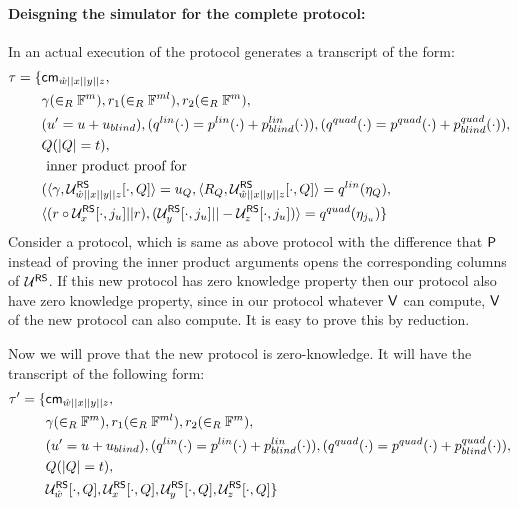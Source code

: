 \paragraph{Deisgning the simulator for the complete protocol: } In an actual execution of the protocol generates a transcript of the form:
\begin{align*}
\tau = \{ 
& \mathsf{cm}_{\hat{w}||x||y||z},\\
& \gamma(\in_R \mathbb{F}^{m}), r_1(\in_R \mathbb{F}^{ml}), r_2(\in_R \mathbb{F}^m), \\ 
& (u' = u+u_{blind}), (q^{lin}(\cdot) = p^{lin}(\cdot)+p^{lin}_{blind}(\cdot)), (q^{quad}(\cdot) = p^{quad}(\cdot) + p^{quad}_{blind}(\cdot)),\\
& Q (|Q|=t),\\
& \text{ inner product proof for } \\
& (\langle \gamma,\mathcal{U}^{\mathsf{RS}}_{\hat{w}||x||y||z}[\cdot, Q]\rangle = u_Q, \langle R_Q,\mathcal{U}^{\mathsf{RS}}_{\hat{w}||x||y||z}[\cdot, Q]\rangle=q^{lin}(\eta_Q),\\
& \langle (r\circ \mathcal{U}^{\mathsf{RS}}_x[\cdot,j_u]||r),(\mathcal{U}^{\mathsf{RS}}_y[\cdot,j_u]||-\mathcal{U}^{\mathsf{RS}}_z[\cdot,j_u])\rangle = q^{quad}(\eta_{j_u})
\}
\end{align*}
Consider a protocol, which is same as above protocol with the difference that $\mathsf{P}$ instead of proving the inner product arguments opens the corresponding columns of $\mathcal{U}^{\mathsf{RS}}$. If this new protocol has zero knowledge property then our protocol also have zero knowledge property, since in our protocol whatever $\mathsf{V}$ can compute, $\mathsf{V}$ of the new protocol can also compute. It is easy to prove this by reduction.

Now we will prove that the new protocol is zero-knowledge. It will have the transcript of the following form:
\begin{align*}
\tau' = \{
& \mathsf{cm}_{\hat{w}||x||y||z},\\
& \gamma(\in_R \mathbb{F}^{m}), r_1(\in_R \mathbb{F}^{ml}), r_2(\in_R \mathbb{F}^m), \\ 
& (u' = u+u_{blind}), (q^{lin}(\cdot) = p^{lin}(\cdot)+p^{lin}_{blind}(\cdot)), (q^{quad}(\cdot) = p^{quad}(\cdot) + p^{quad}_{blind}(\cdot)),\\
& Q (|Q|=t),\\
& \mathcal{U}^{\mathsf{RS}}_{\hat{w}}[\cdot, Q], \mathcal{U}^{\mathsf{RS}}_{x}[\cdot, Q], \mathcal{U}^{\mathsf{RS}}_{y}[\cdot, Q], \mathcal{U}^{\mathsf{RS}}_{z}[\cdot, Q]
\}
\end{align*}

